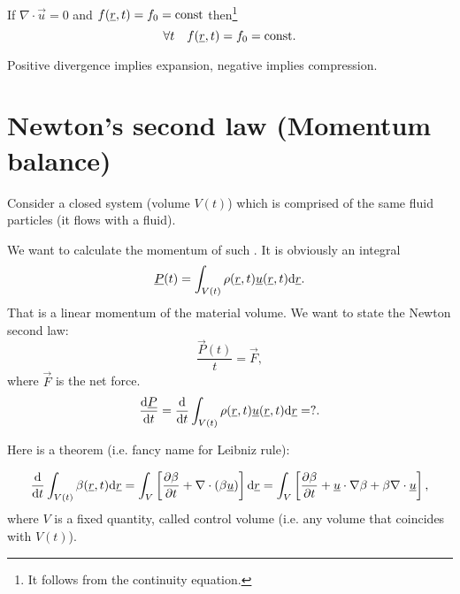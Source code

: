 \documentclass[../main.tex]{subfiles}
\begin{document}
    If $\nabla \cdot \vec u = 0$ and $ f(\underline{r}, t) = f_0 = \textrm{const}$ then\footnote{It follows from the continuity equation.}
    \begin{displaymath}
      \forall t \quad f(\underline{r}, t) = f_0 = \textrm{const}.
    \end{displaymath}

    Positive divergence implies expansion, negative implies compression.
    

    \section{Newton's second law (Momentum balance)}
    Consider a closed system (volume $V(t)$) which is comprised of the same fluid particles
    (it flows with a fluid). 

    \begin{figure}[h]
      \centering
    \end{figure}

    We want to calculate the momentum of such .
    It is obviously an integral
    \begin{displaymath}
      \underline{P} (t) = \int_{V(t)} \rho(\underline{r}, t) \underline{u}(\underline{r}, t) \mathrm{d} \underline{r}.
    \end{displaymath}
    That is a linear momentum of the material volume.
    We want to state the Newton second law:
    \begin{displaymath}
      \dfrac{\vec P(t)}{t} = \vec F, 
    \end{displaymath}
    where $\vec F$ is the net force.
    \begin{displaymath}
      \frac{\mathrm{d} \underline{P}}{\mathrm{d} t} = \frac{\mathrm{d} }{\mathrm{d} t} \int_{V(t)} \rho(\underline{r}, t) \underline{u} (\underline{r}, t) \mathrm{d} \underline{r} = ?.
    \end{displaymath}
    
    Here is a theorem (i.e. fancy name for Leibniz rule):
    
    \begin{theorem}
      \begin{displaymath}
        \frac{\mathrm{d} }{\mathrm{d} t} \int_{V(t)} \beta (\underline{r}, t) \mathrm{d} \underline{r} = 
        \int_{V}\left[ \frac{\partial \beta}{\partial t} + \nabla \cdot (\beta \underline{u}) \right] \mathrm{d} \underline{r}
        = \int_V \left[ \frac{\partial \beta}{\partial t} + \underline{u} \cdot \nabla \beta + \beta \nabla \cdot \underline{u} \right]
        ,
      \end{displaymath}
      where $V$ is a fixed quantity, called control volume (i.e. any volume that coincides with $V(t)$).
    \end{theorem}
\end{document}
